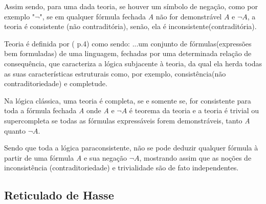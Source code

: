 

Assim sendo, para uma dada teoria, 
se houver um símbolo de negação, 
como por exemplo "\emph{$\neg $}", 
se em qualquer fórmula fechada \emph{A} não for demonstrável \emph{$A$} e \emph{$\neg A $}, 
a teoria é consistente (não contraditória), 
senão, ela é inconsistente(contraditória).


Teoria é definida por \citeauthor{Gomes2013}(\citeyear{Gomes2013} p.4) como sendo:
\citacao
{
...um conjunto de fórmulas(expressões bem formuladas) de uma linguagem, 
fechadas por uma determinada relação de consequência, 
que caracteriza a lógica subjacente à teoria, 
da qual ela herda todas as suas características estruturais como, 
por exemplo, consistência(não contraditoriedade) e completude.
}

Na lógica clássica, 
uma teoria é completa, 
se e somente se, for consistente para toda a fórmula fechada \emph{A} 
onde \emph{A} e \emph{$\neg A$} é teorema da teoria 
e a teoria é trivial ou supercompleta se todas as fórmulas expressáveis forem demonstráveis, 
tanto \emph{A} quanto \emph{$ \neg A$}.


Sendo que toda a lógica paraconsistente, 
não se pode deduzir qualquer fórmula à partir de uma fórmula \emph{A} e sua negação \emph{$\neg A$}, 
mostrando assim que as noções de inconsistência (contraditoriedade) e trivialidade são de fato independentes.







\subsection{Reticulado de Hasse}

